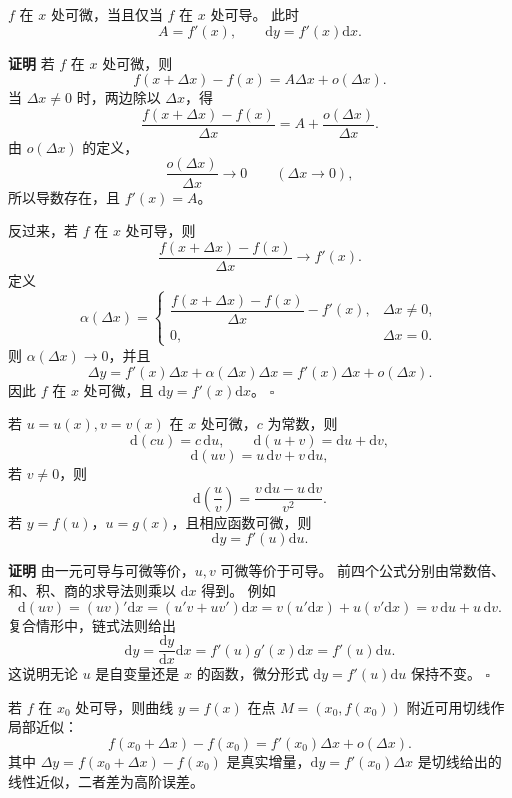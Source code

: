 \documentclass[fontset=fandol]{ctexart}
\newenvironment{proofdetail}{\par\noindent\textbf{证明}\quad}{\hfill$\square$\par\vspace{0.8em}}
\newcommand{\dd}{\mathrm{d}}
\begin{document}
\begin{theorem}[一元可导与可微等价]
$f$ 在 $x$ 处可微，当且仅当 $f$ 在 $x$ 处可导。 此时
\[
A=f'(x),\qquad \dd y=f'(x)\dd x.
\]
\end{theorem}
\begin{proofdetail}
若 $f$ 在 $x$ 处可微，则
\[
f(x+\Delta x)-f(x)=A\Delta x+o(\Delta x).
\]
当 $\Delta x\neq0$ 时，两边除以 $\Delta x$，得
\[
\frac{f(x+\Delta x)-f(x)}{\Delta x}
=A+\frac{o(\Delta x)}{\Delta x}.
\]
由 $o(\Delta x)$ 的定义，
\[
\frac{o(\Delta x)}{\Delta x}\to0\qquad(\Delta x\to0),
\]
所以导数存在，且 $f'(x)=A$。

反过来，若 $f$ 在 $x$ 处可导，则
\[
\frac{f(x+\Delta x)-f(x)}{\Delta x}\to f'(x).
\]
定义
\[
\alpha(\Delta x)=
\begin{cases}
\dfrac{f(x+\Delta x)-f(x)}{\Delta x}-f'(x),&\Delta x\neq0,\\[0.8em]
0,&\Delta x=0.
\end{cases}
\]
则 $\alpha(\Delta x)\to0$，并且
\[
\Delta y=f'(x)\Delta x+\alpha(\Delta x)\Delta x
=f'(x)\Delta x+o(\Delta x).
\]
因此 $f$ 在 $x$ 处可微，且 $\dd y=f'(x)\dd x$。
\end{proofdetail}

\begin{proposition}[微分运算法则]
若 $u=u(x),v=v(x)$ 在 $x$ 处可微，$c$ 为常数，则
\[
\dd(cu)=c\,\dd u,\qquad \dd(u+v)=\dd u+\dd v,
\]
\[
\dd(uv)=u\,\dd v+v\,\dd u,
\]
若 $v\neq0$，则
\[
\dd\left(\frac{u}{v}\right)=\frac{v\,\dd u-u\,\dd v}{v^2}.
\]
若 $y=f(u)$，$u=g(x)$，且相应函数可微，则
\[
\dd y=f'(u)\dd u.
\]
\end{proposition}
\begin{proofdetail}
由一元可导与可微等价，$u,v$ 可微等价于可导。 前四个公式分别由常数倍、和、积、商的求导法则乘以 $\dd x$ 得到。 例如
\[
\dd(uv)=(uv)'\dd x=(u'v+uv')\dd x=v(u'\dd x)+u(v'\dd x)=v\,\dd u+u\,\dd v.
\]
复合情形中，链式法则给出
\[
\dd y=\frac{\dd y}{\dd x}\dd x=f'(u)g'(x)\dd x=f'(u)\dd u.
\]
这说明无论 $u$ 是自变量还是 $x$ 的函数，微分形式 $\dd y=f'(u)\dd u$ 保持不变。
\end{proofdetail}

\begin{proposition}[微分的几何意义]
若 $f$ 在 $x_0$ 处可导，则曲线 $y=f(x)$ 在点 $M=(x_0,f(x_0))$ 附近可用切线作局部近似：
\[
f(x_0+\Delta x)-f(x_0)=f'(x_0)\Delta x+o(\Delta x).
\]
其中 $\Delta y=f(x_0+\Delta x)-f(x_0)$ 是真实增量，$\dd y=f'(x_0)\Delta x$ 是切线给出的线性近似，二者差为高阶误差。
\end{proposition}
\end{document}
